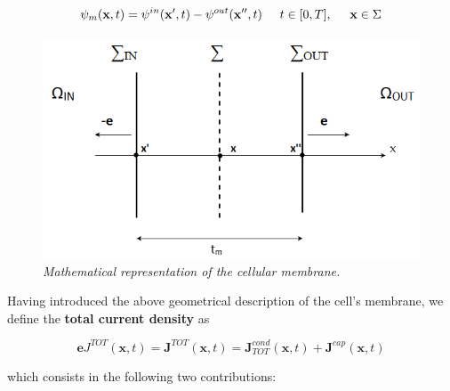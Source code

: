 \documentclass[12pt, a4paper]{report}
\begin{document}
\begin{equation}
\psi_m (\textbf{x},t) = \psi^{in} (\textbf{x}',t) -  \psi^{out} (\textbf{x}'',t) \hspace{0.5 cm}  t \in [0,T], \hspace{0.5 cm} \textbf{x} \in \Sigma
\end{equation}


\begin{figure}[H]	
	
	\centering
	\includegraphics[scale=0.65]{intra.png}
	
	\caption{\textit {Mathematical representation of the cellular membrane.}} \label{intra}
	
\end{figure}

Having introduced the above geometrical description of the cell's membrane, we define the \textbf{total current density}  as

\begin{equation}
\textbf{e} J^{TOT}(\textbf{x},t) =	\textbf{J}^{TOT}(\textbf{x},t) = \textbf{J}^{cond}_{TOT}(\textbf{x},t) +\textbf{J}^{cap}(\textbf{x},t) 
\end{equation}	

which consists in the following two contributions:
\end{document}
